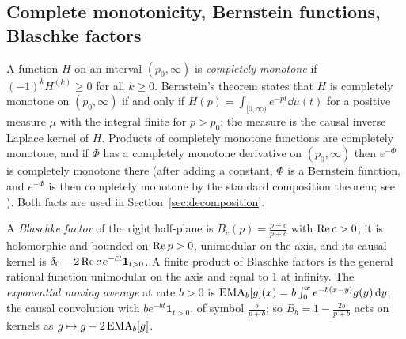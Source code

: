 \subsection{Complete monotonicity, Bernstein functions, Blaschke factors}

A function $H$ on an interval $(p_0,\infty)$ is \emph{completely monotone} if
$(-1)^kH^{(k)}\geq0$ for all $k\geq0$. Bernstein's theorem states that $H$ is
completely monotone on $(p_0,\infty)$ if and only if
$H(p)=\int_{[0,\infty)}e^{-pt}\dd\mu(t)$ for a positive measure $\mu$ with the
integral finite for $p>p_0$; the measure is the causal inverse Laplace kernel
of $H$. Products of completely monotone functions are completely monotone, and
if $\Phi$ has a completely monotone derivative on $(p_0,\infty)$ then
$e^{-\Phi}$ is completely monotone there (after adding a constant, $\Phi$ is a
Bernstein function, and $e^{-\Phi}$ is then completely monotone by the standard
composition theorem; see \cite{SSV}). Both facts are used in
Section~\ref{sec:decomposition}.

A \emph{Blaschke factor} of the right half-plane is
$B_c(p)=\frac{p-c}{p+\bar c}$ with $\operatorname{Re} c>0$; it is holomorphic and bounded on
$\operatorname{Re} p>0$, unimodular on the axis, and its causal kernel is
$\delta_0-2\operatorname{Re} c\,e^{-\bar ct}\mathbf 1_{t>0}$. A finite product of Blaschke
factors is the general rational function unimodular on the axis and equal to
$1$ at infinity. The \emph{exponential moving average} at rate $b>0$ is
$\operatorname{EMA}_b[g](x)=b\int_0^xe^{-b(x-y)}g(y)\,\mathrm d y$, the causal convolution with
$be^{-bt}\mathbf 1_{t>0}$, of symbol $\frac b{p+b}$; so
$B_b=1-\frac{2b}{p+b}$ acts on kernels as $g\mapsto g-2\operatorname{EMA}_b[g]$.
